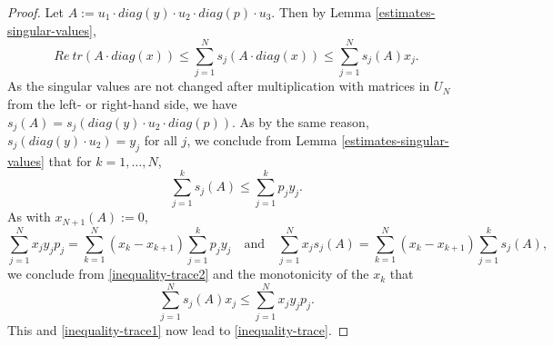 \documentclass[reqno]{amsart}
\theoremstyle{plain}
\theoremstyle{definition}
\numberwithin{equation}{section}
\begin{document}
\begin{proof} Let $A:=u_1 \cdot diag(y)  \cdot u_2 \cdot  diag(p) \cdot u_3$. 
  Then by Lemma \ref{estimates-singular-values},
  \begin{equation}\label{inequality-trace1}  Re\> tr(A\cdot diag(x))\le \sum_{j=1}^N s_j(A\cdot diag(x))\le \sum_{j=1}^N s_j(A)x_j.
    \end{equation}
  As the singular values are not changed after multiplication with matrices in $U_N$ from the left- or right-hand side, we have
  $s_j(A)=s_j(diag(y)  \cdot u_2 \cdot  diag(p))$.
   As by the same reason, $s_j(diag(y) \cdot u_2)=y_j $ for all $j$, we conclude from Lemma \ref{estimates-singular-values}
   that for $k=1,\ldots,N$,
   \begin{equation}\label{inequality-trace2} \sum_{j=1}^k s_j(A)\le \sum_{j=1}^kp_jy_j.\end{equation}
   As with $x_{N+1}(A):=0$,
$$\sum_{j=1}^Nx_jy_jp_j= \sum_{k=1}^N (x_k-x_{k+1})\sum_{j=1}^k p_jy_j  \quad\text{and}\quad
   \sum_{j=1}^Nx_js_j(A)= \sum_{k=1}^N (x_k-x_{k+1})\sum_{j=1}^k s_j(A),$$
     we conclude from \eqref{inequality-trace2} and the monotonicity of the $x_k$ that
 \begin{equation}\label{inequality-trace3}   \sum_{j=1}^N s_j(A)x_j\le\sum_{j=1}^N x_jy_jp_j.
 \end{equation}
 This and \eqref{inequality-trace1} now lead to \eqref{inequality-trace}.


\end{proof}
\end{document}
